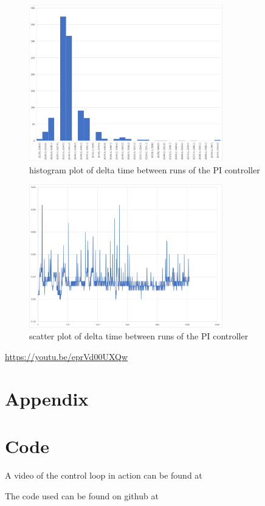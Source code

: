 \documentclass{article}
\begin{document}
\begin{figure}[h!t]
    \centering
    \includegraphics[width=0.75\textwidth]{Project4KernelSpaceEncoderDriver/histogram_timebetweenruns.png}
    \caption{histogram plot of delta time between runs of the PI controller}
    \label{fig:histogramDelta}
\end{figure}
\begin{figure}[h!]
    \centering
    \includegraphics[width=0.75\textwidth]{Project4KernelSpaceEncoderDriver/scatterplot_between_runs.png}
    \caption{scatter plot of delta time between runs of the PI controller}
    \label{fig:scatterplotDelta}
\end{figure}
\url{https://youtu.be/eprVd00UXQw}
\newpage
\section*{Appendix}
\appendix

\newpage
\section{Code}\label{appendix:code}
A video of the control loop in action can be found at \url{}

The code used can be found on github at \url{}
\end{document}

